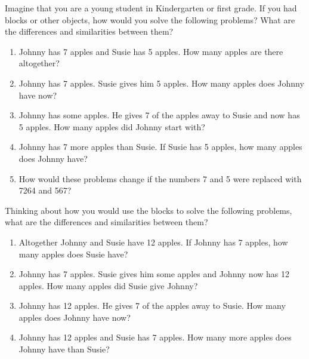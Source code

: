 \documentclass{ximera}
\begin{document}
\begin{question}
Imagine that you are a young student in Kindergarten or first grade.  If you had blocks or other objects, how would you solve the following problems?  What are the differences and similarities between them?
\begin{enumerate}
\item Johnny has 7 apples and Susie has 5 apples.  How many apples are there altogether?
\item Johnny has 7 apples.  Susie gives him 5 apples.  How many apples does Johnny have now?
\item Johnny has some apples.  He gives 7 of the apples away to Susie and now has 5 apples.  How many apples did Johnny start with?
\item Johnny has 7 more apples than Susie.  If Susie has 5 apples, how many apples does Johnny have?
\item How would these problems change if the numbers 7 and 5 were replaced with 7264 and 567?
\end{enumerate}
\end{question}


\begin{question}
 Thinking about how you would use the blocks to solve the following problems, what are the differences and similarities between them?
\begin{enumerate}
\item Altogether Johnny and Susie have 12 apples.  If Johnny has 7 apples, how many apples does Susie have?
\item Johnny has 7 apples.  Susie gives him some apples and Johnny now has 12 apples.  How many apples did Susie give Johnny?
\item Johnny has 12 apples.  He gives 7 of the apples away to Susie.  How many apples does Johnny have now?
\item Johnny has 12 apples and Susie has 7 apples.  How many more apples does Johnny have than Susie?
\end{enumerate}
\end{question}
\end{document}
